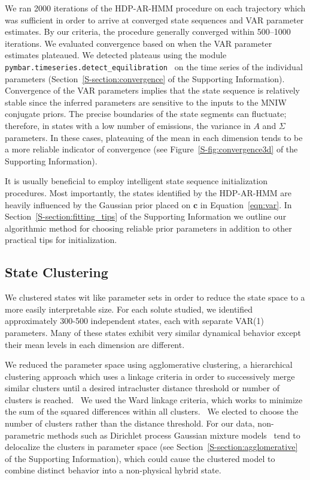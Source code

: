 \documentclass[journal=jpcbfk,manuscript=article]{achemso}
\begin{document}
  We ran 2000 iterations of the HDP-AR-HMM procedure on each trajectory which
  was sufficient in order to arrive at converged state sequences and VAR parameter
  estimates. By our criteria, the procedure generally converged within 500--1000 iterations. We 
  evaluated convergence based on when the VAR parameter estimates plateaued. 
  We detected plateaus using the module \texttt{pymbar.timeseries.detect\_equilibration}~\cite{chodera_simple_2016} 
  on the time series of the individual parameters (Section~\ref{S-section:convergence}
  of the Supporting Information). Convergence of the VAR parameters implies that
  the state sequence is relatively stable since the inferred parameters are 
  sensitive to the inputs to the MNIW conjugate priors. The precise boundaries of 
  the state segments can fluctuate; therefore, in states with a low number of 
  emissions,  the variance in $A$ and $\Sigma$ parameters. 
  In these cases, plateauing
  of the mean in each dimension tends to be a more reliable indicator of convergence (see 
  Figure~\ref{S-fig:convergence3d} of the Supporting Information).
  
  It is usually beneficial to employ intelligent state sequence initialization procedures. 
  Most importantly, the states identified by the HDP-AR-HMM are heavily influenced by the 
  Gaussian prior placed on $\mathbf{c}$ in Equation~\ref{eqn:var}. In 
  Section~\ref{S-section:fitting_tips} of the Supporting Information we outline our 
  algorithmic method for choosing reliable prior parameters in addition to other 
  practical tips for initialization.
  
  \subsection{State Clustering}\label{method:clustering}  

  We clustered states wit like parameter sets in order to reduce the state space to
  a more easily interpretable size. For each solute studied, we identified approximately 
  300-500 independent states, each with separate VAR(1) parameters. Many of these states
  exhibit very similar dynamical behavior except their mean levels in each dimension
  are different.
  
  We reduced the parameter space using agglomerative clustering, a hierarchical
  clustering approach which uses a linkage criteria in order to successively merge
  similar clusters until a desired intracluster distance threshold or number of
  clusters is reached.~\cite{pedregosa_scikit-learn_2011} We used the Ward linkage 
  criteria, which works to minimize the sum of the squared differences within all
  clusters.~\cite{ward_hierarchical_1963} We elected to choose the number of clusters
  rather than the distance threshold. For our data, non-parametric methods such as 
  Dirichlet process Gaussian mixture models~\cite{pedregosa_scikit-learn_2011,gelman_bayesian_2013}
  tend to delocalize the clusters in parameter space (see Section~\ref{S-section:agglomerative}
  of the Supporting Information), which could cause the clustered model to combine 
  distinct behavior into a non-physical hybrid state.
\end{document}
